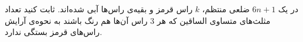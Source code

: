 \EXERCISE
در یک
$6n + 1$
ضلعی منتظم،
$k$
راس قرمز و بقیه‌ی راس‌ها آبی شده‌اند. ثابت کنید تعداد مثلث‌های متساوی الساقین که هر
$3$
راس آن‌ها هم رنگ باشند به نحوه‌ی آرایش راس‌های قرمز بستگی ندارد.